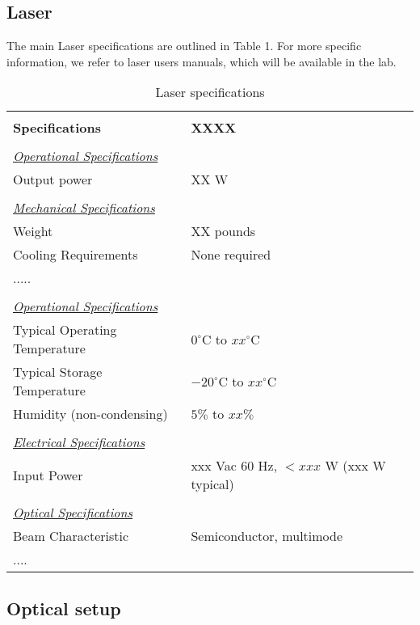\subsection{Laser}

The main Laser specifications are outlined in Table 1. For more specific
information, we refer to laser users manuals, 
which will be available in the lab.

\begin{table}
\begin{center}
\begin{tabular}{|l|l|}
\hline
& \\
{\bf Specifications}&{\bf XXXX} \\
\hline
& \\
\underline {\it Operational Specifications}& \\
Output power			& XX W \\
& \\
\underline {\it Mechanical Specifications}& \\
Weight			        & XX pounds  \\
Cooling Requirements 		& None required \\
.....\\
& \\
\underline {\it Operational Specifications}& \\
Typical Operating Temperature   & $0^\circ$C to $xx^\circ$C \\
Typical Storage Temperature     & $-20^\circ$C to $xx^\circ$C \\
Humidity (non-condensing)       & $5\%$ to $xx\%$  \\
& \\
\underline {\it Electrical Specifications}& \\
Input Power	                & xxx Vac 60 Hz, $<xxx$ W (xxx W typical) \\
& \\
\underline {\it Optical Specifications}& \\
Beam Characteristic 		& Semiconductor, multimode \\
....\\
\hline
\end{tabular}
\label{speclaser}
\caption{Laser specifications}
\end{center}
\end{table}


\subsection{Optical setup}

